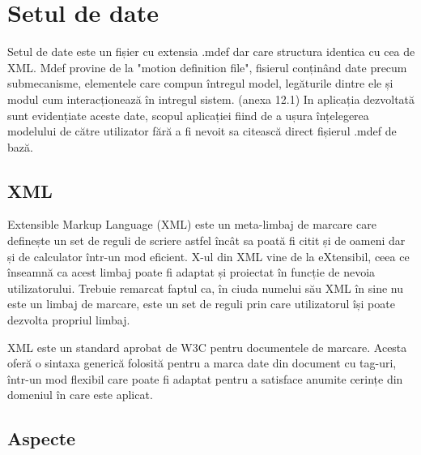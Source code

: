 \newpage
\section{Setul de date}

Setul de date este un fișier cu extensia .mdef dar care structura identica cu cea de XML. Mdef provine de la "motion definition file", fisierul conținând
date precum submecanisme, elementele care compun întregul model, legăturile dintre ele și modul cum interacționează în intregul sistem. (anexa 12.1) In aplicația dezvoltată sunt evidențiate
aceste date, scopul aplicației fiind de a ușura înțelegerea modelului de către utilizator fără a fi nevoit sa citească direct fișierul .mdef de bază.

\subsection{XML}
Extensible Markup Language (XML) este un meta-limbaj de marcare care definește un set de reguli de scriere astfel încât sa poată fi citit și de oameni dar și de calculator într-un mod eficient. X-ul din XML vine de la eXtensibil, ceea ce înseamnă ca acest limbaj poate fi adaptat și proiectat în funcție de nevoia utilizatorului. Trebuie remarcat faptul ca, în ciuda numelui său XML în sine nu este un limbaj de marcare, este un set de reguli prin care utilizatorul își poate dezvolta propriul limbaj.\cite{xml}

XML este un standard aprobat de W3C pentru documentele de marcare. Acesta oferă o
sintaxa generică folosită pentru a marca date din document cu tag-uri, într-un mod flexibil care poate fi adaptat pentru a satisface anumite cerințe din domeniul în care este aplicat.

\subsection{Aspecte}

